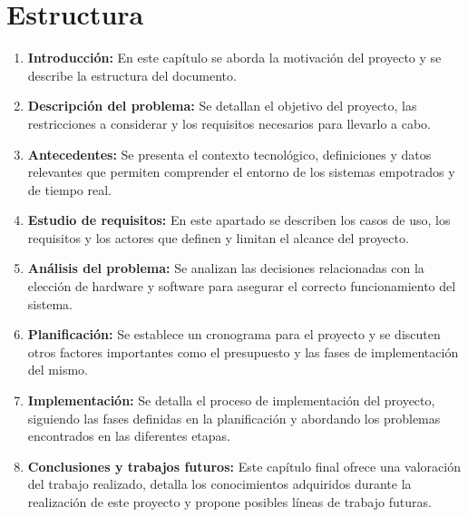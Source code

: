 \section{Estructura}
\begin{enumerate}
    \item \textbf{Introducción:} En este capítulo se aborda la motivación del proyecto y se describe la estructura del documento.
    \item \textbf{Descripción del problema:} Se detallan el objetivo del proyecto, las restricciones a considerar y los requisitos necesarios para llevarlo a cabo.
    \item \textbf{Antecedentes:} Se presenta el contexto tecnológico, definiciones y datos relevantes que permiten comprender el entorno de los sistemas empotrados y de tiempo real.
    \item \textbf{Estudio de requisitos:} En este apartado se describen los casos de uso, los requisitos y los actores que definen y limitan el alcance del proyecto.
    \item \textbf{Análisis del problema:} Se analizan las decisiones relacionadas con la elección de hardware y software para asegurar el correcto funcionamiento del sistema.
    \item \textbf{Planificación:} Se establece un cronograma para el proyecto y se discuten otros factores importantes como el presupuesto y las fases de implementación del mismo.
    \item \textbf{Implementación:} Se detalla el proceso de implementación del proyecto, siguiendo las fases definidas en la planificación y abordando los problemas encontrados en las diferentes etapas.
    \item \textbf{Conclusiones y trabajos futuros:} Este capítulo final ofrece una valoración del trabajo realizado, detalla los conocimientos adquiridos durante la realización de este proyecto y propone posibles líneas de trabajo futuras.
\end{enumerate}
